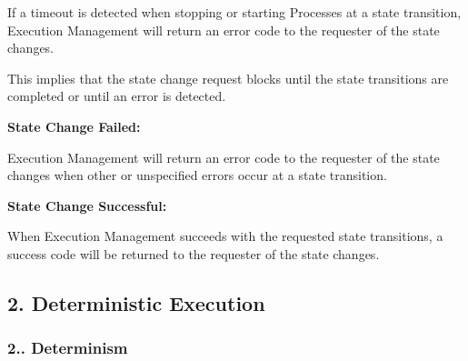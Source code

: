 \begin{DoxyItemize}
\begin{DoxyItemize}
\item If a timeout is detected when stopping or starting Processes at a state transition, Execution Management will return an error code to the requester of the state changes.
\item This implies that the state change request blocks until the state transitions are completed or until an error is detected.
\end{DoxyItemize}
\item {\bfseries State Change Failed\+:}
\begin{DoxyItemize}
\item Execution Management will return an error code to the requester of the state changes when other or unspecified errors occur at a state transition.
\end{DoxyItemize}
\item {\bfseries State Change Successful\+:}
\begin{DoxyItemize}
\item When Execution Management succeeds with the requested state transitions, a success code will be returned to the requester of the state changes.
\end{DoxyItemize}
\end{DoxyItemize}

\subsection*{2. {\bfseries Deterministic Execution}}

\subsubsection*{2.. {\bfseries Determinism}}


